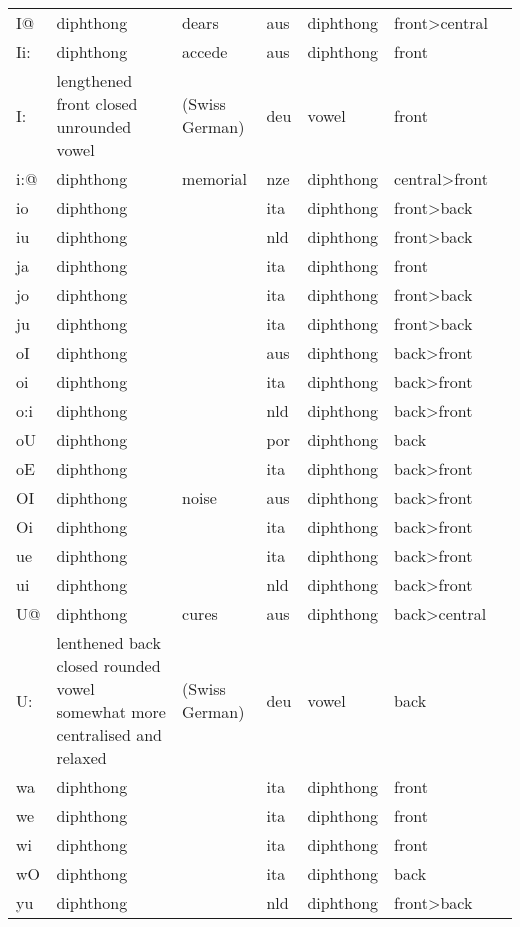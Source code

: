 \begin{longtable}{l|p{.3\linewidth}|p{.15\linewidth}|l|l|l|l}
	I@	& diphthong	& dears	& aus	& diphthong	& front\textgreater central	\\
	Ii:	& diphthong	& accede	& aus	& diphthong	& front	\\
	I:	& lengthened front closed unrounded vowel	& (Swiss German)	& deu	& vowel	& front	\\
	i:@	& diphthong	& memorial	& nze	& diphthong	& central\textgreater front	\\
	io	& diphthong	& 	& ita	& diphthong	& front\textgreater back	\\
	iu	& diphthong	& 	& nld	& diphthong	& front\textgreater back	\\
	ja	& diphthong	& 	& ita	& diphthong	& front	\\
	jo	& diphthong	& 	& ita	& diphthong	& front\textgreater back	\\
	ju	& diphthong	& 	& ita	& diphthong	& front\textgreater back	\\
	oI	& diphthong	& 	& aus	& diphthong	& back\textgreater front	\\
	oi	& diphthong	& 	& ita	& diphthong	& back\textgreater front	\\
	o:i	& diphthong	& 	& nld	& diphthong	& back\textgreater front	\\
	oU	& diphthong	& 	& por	& diphthong	& back	\\
	oE	& diphthong	& 	& ita	& diphthong	& back\textgreater front	\\
	OI	& diphthong	& noise	& aus	& diphthong	& back\textgreater front	\\
	Oi	& diphthong	& 	& ita	& diphthong	& back\textgreater front	\\
	ue	& diphthong	& 	& ita	& diphthong	& back\textgreater front	\\
	ui	& diphthong	& 	& nld	& diphthong	& back\textgreater front	\\
	U@	& diphthong	& cures	& aus	& diphthong	& back\textgreater central	\\
	U:	& lenthened back closed rounded vowel somewhat more centralised and relaxed	& (Swiss German)	& deu	& vowel	& back	\\
	wa	& diphthong	& 	& ita	& diphthong	& front	\\
	we	& diphthong	& 	& ita	& diphthong	& front	\\
	wi	& diphthong	& 	& ita	& diphthong	& front	\\
	wO	& diphthong	& 	& ita	& diphthong	& back	\\
	yu	& diphthong	& 	& nld	& diphthong	& front\textgreater back	\\

\end{longtable}
